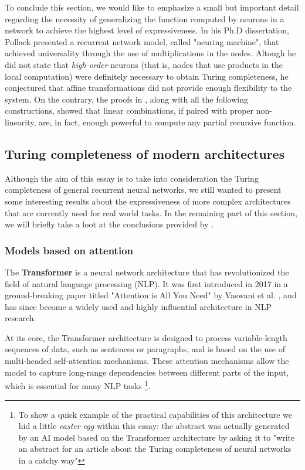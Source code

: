 \documentclass{article}
\begin{document}
To conclude this section, we would like to emphasize a small but important detail regarding the necessity of generalizing the function computed by neurons in a network to achieve the highest level of expressiveness. In his Ph.D dissertation, Pollack \cite{POL87} presented a recurrent network model, called "neuring machine", that achieved universality through the use of multiplications in the nodes. Altough he did not state that \textit{high-order} neurons (that is, nodes that use products in the local computation) were definitely necessary to obtain Turing completeness, he conjectured that affine transformations did not provide enough flexibility to the system. On the contrary, the proofs in \cite{SIE95}, along with all the following constructions, showed that linear combinations, if paired with proper non-linearity, are, in fact, enough powerful to compute any partial recursive function.

\subsection{Turing completeness of modern architectures}

Although the aim of this essay is to take into consideration the Turing completeness of general recurrent neural networks, we still wanted to present some interesting results about the expressiveness of more complex architectures that are currently used for real world tasks. In the remaining part of this section, we will briefly take a loot at the conclusions provided by \cite{PER19}.

\subsubsection{Models based on attention}
The \textbf{Transformer} is a neural network architecture that has revolutionized the field of natural language processing (NLP). It was first introduced in 2017 in a ground-breaking paper titled "Attention is All You Need" by Vaswani et al. \cite{VAS17}, and has since become a widely used and highly influential architecture in NLP research.

At its core, the Transformer architecture is designed to process variable-length sequences of data, such as sentences or paragraphs, and is based on the use of multi-headed self-attention mechanisms. These attention mechanisms allow the model to capture long-range dependencies between different parts of the input, which is essential for many NLP tasks \footnote{To show a quick example of the practical capabilities of this architecture we hid a little \textit{easter egg} within this essay: the abstract was actually generated by an AI model based on the Transformer architecture by asking it to "write an abstract for an article about the Turing completeness of neural networks in a catchy way"}.
\end{document}

